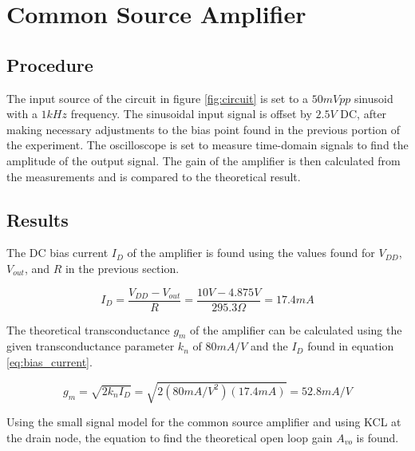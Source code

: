 \section{Common Source Amplifier}

\subsection{Procedure}

The input source of the circuit in figure \ref{fig:circuit} is set to a $50 mVpp$ sinusoid with a $1 kHz$ frequency.
The sinusoidal input signal is offset by $2.5 V$ DC, after making necessary adjustments to the bias point found in the previous portion of the experiment.
The oscilloscope is set to measure time-domain signals to find the amplitude of the output signal.
The gain of the amplifier is then calculated from the measurements and is compared to the theoretical result.

\FloatBarrier

\subsection{Results}

The DC bias current $I_D$ of the amplifier is found using the values found for $V_{DD}$, $V_{out}$, and $R$ in the previous section.

\FloatBarrier

\begin{equation}
	\label{eq:bias_current}
	I_D = \frac{V_{DD}-V_{out}}{R} = \frac{10 V - 4.875 V}{295.3 \Omega} = 17.4 mA
\end{equation}

\FloatBarrier

The theoretical transconductance $g_m$ of the amplifier can be calculated using the given transconductance parameter $k_n$ of $80 mA/V$ and the $I_D$ found in equation \ref{eq:bias_current}.

\FloatBarrier

\begin{equation}
	\label{eq:g_m}
	g_m = \sqrt{2k_nI_D} = \sqrt{2(80 mA/V^2)(17.4 mA)} = 52.8 mA/V
\end{equation}

\FloatBarrier

Using the small signal model for the common source amplifier and using KCL at the drain node, the equation to find the theoretical open loop gain $A_{vo}$ is found.

\FloatBarrier

